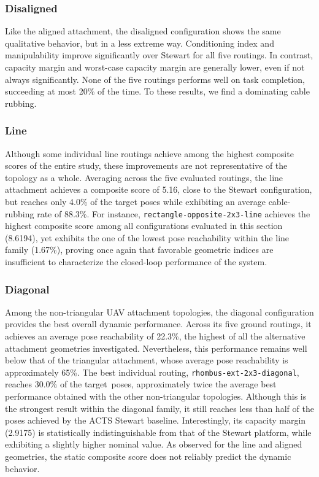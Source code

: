 \subsubsection{Disaligned}
Like the aligned attachment, the disaligned configuration shows the same qualitative behavior, but in a less extreme way. Conditioning index and manipulability improve significantly over Stewart for all five routings. In contrast, capacity margin and worst-case capacity margin are generally lower, even if not always significantly.
None of the five routings performs well on task completion, succeeding at most 20\% of the time. To these results, we find a dominating cable rubbing.


\subsubsection{Line}
Although some individual line routings achieve among the highest composite scores of the entire study, these improvements are not representative of the topology as a whole. Averaging across the five evaluated routings, the line attachment achieves a composite score of 5.16, close to the Stewart configuration, but reaches only 4.0\% of the target poses while exhibiting an average cable-rubbing rate of 88.3\%. For instance, \texttt{rectangle-opposite-2x3-line} achieves the highest composite score among all configurations evaluated in this section (8.6194), yet exhibits the one of the lowest pose reachability within the line family (1.67\%), proving once again that favorable geometric indices are insufficient to characterize the closed-loop performance of the system.

\subsubsection{Diagonal}
Among the non-triangular UAV attachment topologies, the diagonal configuration provides the best overall dynamic performance. Across its five ground routings, it achieves an average pose reachability of 22.3\%, the highest of all the alternative attachment geometries investigated. Nevertheless, this performance remains well below that of the triangular attachment, whose average pose reachability is approximately 65\%. 
The best individual routing, \texttt{rhombus-ext-2x3-diagonal}, reaches 30.0\% of the target\ poses, approximately twice the average best performance obtained with the other non-triangular topologies. Although this is the strongest result within the diagonal family, it still reaches less than half of the poses achieved by the ACTS Stewart baseline. Interestingly, its capacity margin (2.9175) is statistically indistinguishable from that of the Stewart platform, while exhibiting a slightly higher nominal value.
As observed for the line and aligned geometries, the static composite score does not reliably predict the dynamic behavior.


